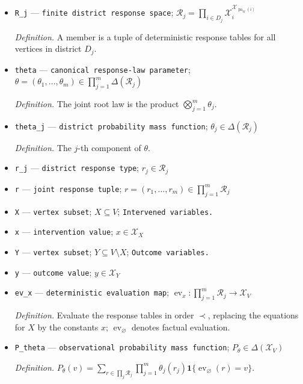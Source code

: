 \documentclass{article}
\begin{document}
\begin{itemize}
  \par\smallskip\noindent\emph{Definition.} \(S^{\le k}=\{s_{\le k}:s\in S\}\), with \(S^{\le0}=\{()\}\).
  \item \texttt{R\_\allowbreak{}j} --- \texttt{finite district response space}; \(\mathcal R_j=\prod_{i\in D_j}\mathcal X_i^{\mathcal X_{\operatorname{pa}_G(i)}}\)
  \par\smallskip\noindent\emph{Definition.} A member is a tuple of deterministic response tables for all vertices in district \(D_j\).
  \item \texttt{theta} --- \texttt{canonical response-\allowbreak{}law parameter}; \(\theta=(\theta_1,\ldots,\theta_m)\in\prod_{j=1}^m\Delta(\mathcal R_j)\)
  \par\smallskip\noindent\emph{Definition.} The joint root law is the product \(\bigotimes_{j=1}^m\theta_j\).
  \item \texttt{theta\_\allowbreak{}j} --- \texttt{district probability mass function}; \(\theta_j\in\Delta(\mathcal R_j)\)
  \par\smallskip\noindent\emph{Definition.} The \(j\)-th component of \(\theta\).
  \item \texttt{r\_\allowbreak{}j} --- \texttt{district response type}; \(r_j\in\mathcal R_j\)
  \item \texttt{r} --- \texttt{joint response tuple}; \(r=(r_1,\ldots,r_m)\in\prod_{j=1}^m\mathcal R_j\)
  \item \texttt{X} --- \texttt{vertex subset}; \(X\subseteq V\); \texttt{Intervened variables.}
  \item \texttt{x} --- \texttt{intervention value}; \(x\in\mathcal X_X\)
  \item \texttt{Y} --- \texttt{vertex subset}; \(Y\subseteq V\setminus X\); \texttt{Outcome variables.}
  \item \texttt{y} --- \texttt{outcome value}; \(y\in\mathcal X_Y\)
  \item \texttt{ev\_\allowbreak{}x} --- \texttt{deterministic evaluation map}; \(\operatorname{ev}_x:\prod_{j=1}^m\mathcal R_j\to\mathcal X_V\)
  \par\smallskip\noindent\emph{Definition.} Evaluate the response tables in order \(\prec\), replacing the equations for \(X\) by the constants \(x\); \(\operatorname{ev}_{\varnothing}\) denotes factual evaluation.
  \item \texttt{P\_\allowbreak{}theta} --- \texttt{observational probability mass function}; \(P_{\theta}\in\Delta(\mathcal X_V)\)
  \par\smallskip\noindent\emph{Definition.} \(P_{\theta}(v)=\sum_{r\in\prod_j\mathcal R_j}\prod_{j=1}^m\theta_j(r_j)\mathbf 1\{\operatorname{ev}_{\varnothing}(r)=v\}\).

\end{itemize}
\end{document}
